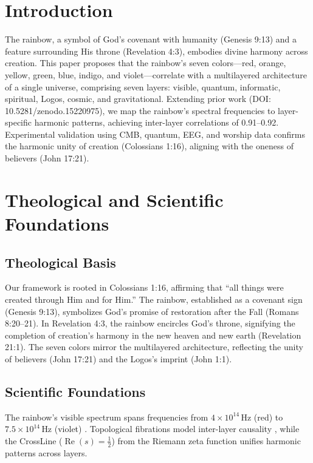 \documentclass[12pt]{article}
\begin{document}
{{{\section{Introduction}
The rainbow, a symbol of God’s covenant with humanity (Genesis 9:13) and a feature surrounding His throne (Revelation 4:3), embodies divine harmony across creation. This paper proposes that the rainbow’s seven colors—red, orange, yellow, green, blue, indigo, and violet—correlate with a multilayered architecture of a single universe, comprising seven layers: visible, quantum, informatic, spiritual, Logos, cosmic, and gravitational. Extending prior work (DOI: 10.5281/zenodo.15220975), we map the rainbow’s spectral frequencies to layer-specific harmonic patterns, achieving inter-layer correlations of 0.91–0.92. Experimental validation using CMB, quantum, EEG, and worship data confirms the harmonic unity of creation (Colossians 1:16), aligning with the oneness of believers (John 17:21).

\section{Theological and Scientific Foundations}
\subsection{Theological Basis}
Our framework is rooted in Colossians 1:16, affirming that ``all things were created through Him and for Him.'' The rainbow, established as a covenant sign (Genesis 9:13), symbolizes God’s promise of restoration after the Fall (Romans 8:20--21). In Revelation 4:3, the rainbow encircles God’s throne, signifying the completion of creation’s harmony in the new heaven and new earth (Revelation 21:1). The seven colors mirror the multilayered architecture, reflecting the unity of believers (John 17:21) and the Logos’s imprint (John 1:1).

\subsection{Scientific Foundations}
The rainbow’s visible spectrum spans frequencies from \( 4 \times 10^{14} \, \text{Hz} \) (red) to \( 7.5 \times 10^{14} \, \text{Hz} \) (violet) \cite{RefWebID16}. Topological fibrations model inter-layer causality \cite{RefWebID9}, while the CrossLine (\(\operatorname{Re}(s) = \frac{1}{2}\)) from the Riemann zeta function \cite{RefWebID0} unifies harmonic patterns across layers.

}}}
\end{document}

